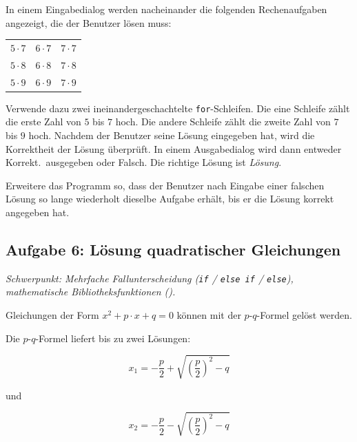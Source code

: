 \begin{compactenum}[a)]
\item In einem Eingabedialog werden nacheinander die folgenden Rechenaufgaben
angezeigt, die der Benutzer lösen muss:

\vspace{3mm}

\begin{tabular}{ccc}
$5 \cdot 7$ & $6 \cdot 7$ & $7 \cdot 7$ \\
$5 \cdot 8$ & $6 \cdot 8$ & $7 \cdot 8$ \\
$5 \cdot 9$ & $6 \cdot 9$ & $7 \cdot 9$ \\
\end{tabular}

\vspace{3mm}

Verwende dazu zwei ineinandergeschachtelte \lstinline|for|-Schleifen. Die eine
Schleife zählt die erste Zahl von $5$ bis $7$ hoch. Die andere Schleife zählt
die zweite Zahl von $7$ bis $9$ hoch. Nachdem der Benutzer seine Lösung
eingegeben hat, wird die Korrektheit der Lösung überprüft. In einem
Ausgabedialog wird dann entweder \glqq Korrekt.\grqq\ ausgegeben oder
\glqq Falsch. Die richtige Lösung ist \emph{Lösung}.\grqq

\item Erweitere das Programm so, dass der Benutzer nach Eingabe einer falschen
Lösung so lange wiederholt dieselbe Aufgabe erhält, bis er die Lösung korrekt
angegeben hat.
\end{compactenum}


\subsection{Aufgabe 6: Lösung quadratischer Gleichungen \tagLK}
\noindent \emph{Schwerpunkt: Mehrfache Fallunterscheidung (\texttt{if} /
\texttt{else if} / \texttt{else}), mathematische Bibliotheksfunktionen
().}

Gleichungen der Form $x^2 + p \cdot x + q = 0$ können mit der $p$-$q$-Formel
gelöst werden.

Die $p$-$q$-Formel liefert bis zu zwei Lösungen:

\begin{minipage}{0.45\textwidth}
\[
x_1 = - \frac{p}{2} + \sqrt{\left(\frac{p}{2}\right)^2 - q}
\]
\end{minipage}
und 
\begin{minipage}{0.45\textwidth}
\[
x_2 = - \frac{p}{2} - \sqrt{\left(\frac{p}{2}\right)^2 - q}
\]
\end{minipage}

